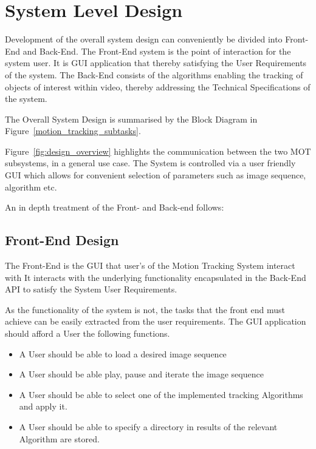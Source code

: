 \section{System Level Design}
Development of the overall system design can conveniently be divided into
Front-End and Back-End. The Front-End system is the point of interaction for the
system user. It is GUI application that thereby satisfying the User Requirements
of the system. The Back-End consists of the algorithms enabling the tracking of
objects of interest within video, thereby addressing the Technical
Specifications of the system.

The Overall System Design is summarised by the Block Diagram in Figure~\ref{motion_tracking_subtasks}.

Figure~\ref{fig:design_overview} highlights the communication between the two MOT
subsystems, in a general use case. The System is controlled via a user
friendly GUI which allows for convenient selection of parameters such as
image sequence, algorithm etc.

An in depth treatment of the Front- and Back-end follows:

\subsection{Front-End Design}
The Front-End is the GUI that user's of the Motion Tracking System interact with 
It interacts with the underlying functionality encapsulated in the Back-End API to
satisfy the System User Requirements. 

As the functionality of the system is not, the tasks that the front
end must achieve can be easily extracted from the user requirements. The GUI
application should afford a User the following functions.
\begin{itemize}
    \item A User should be able to load a desired image sequence
    \item A User should be able play, pause and iterate the image sequence 
    \item A User should be able to select one of the implemented tracking
        Algorithms and apply it.
    \item A User should be able to specify a directory in results of the
        relevant Algorithm are stored.
\end{itemize}


